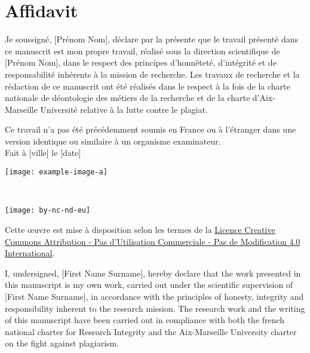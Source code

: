 \newpage
\chapter*{Affidavit}					
\thispagestyle{empty}

\iftrue %
    Je soussigné, [Prénom Nom], %
    déclare par la présente que le travail présenté dans ce manuscrit est mon propre travail, réalisé sous la direction scientifique de [Prénom Nom], %
    dans le respect des principes d’honnêteté, d'intégrité et de responsabilité inhérents à la mission de recherche. Les travaux de recherche et la rédaction de ce manuscrit ont été réalisés dans le respect à la fois de la charte nationale de déontologie des métiers de la recherche et de la charte d’Aix-Marseille Université relative à la lutte contre le plagiat.
    
    Ce travail n'a pas été précédemment soumis en France ou à l'étranger dans une version identique ou similaire à un organisme examinateur.\\
    
    Fait à [ville] le [date]
    
    \begin{flushright}\texttt{[image: example-image-a]}\end{flushright}%

    ~\vfill
    \begin{center}
        \begin{minipage}[c]{0.25\linewidth}
            \texttt{[image: by-nc-nd-eu]}
        \end{minipage}\hfill
    \end{center}

    Cette \oe{}uvre est mise à disposition selon les termes de la \href{https://creativecommons.org/licenses/by-nc-nd/4.0/deed.fr}{Licence Creative Commons Attribution - Pas d’Utilisation Commerciale - Pas de Modification 4.0 International}. %
\fi

\iffalse %
    I, undersigned, [First Name Surname], %
    hereby declare that the work presented in this manuscript is my own work, carried out under the scientific supervision of [First Name Surname], %
    in accordance with the principles of honesty, integrity and responsibility inherent to the research mission. The research work and the writing of this manuscript have been carried out in compliance with both the french national charter for Research Integrity and the Aix-Marseille University charter on the fight against plagiarism.
    
